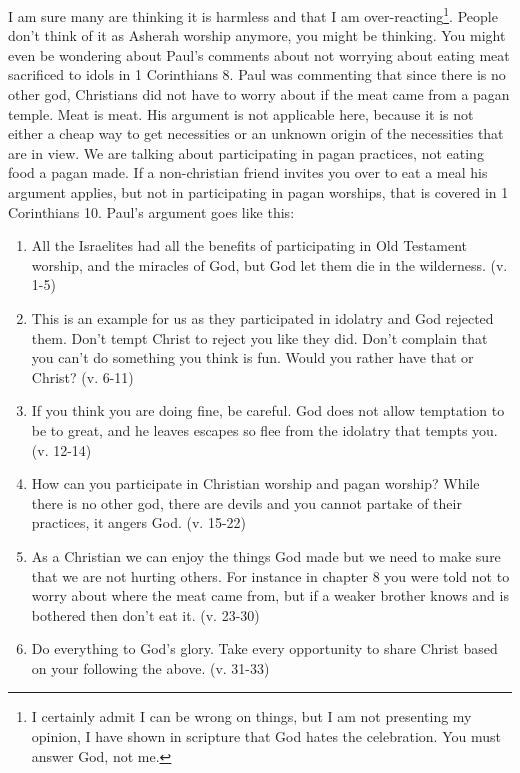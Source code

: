 I am sure many are thinking it is harmless and that I am over-reacting\footnote{I certainly admit I can be wrong on things, but I am not presenting my opinion, I have shown in scripture that God hates the celebration.  You must answer God, not me.}.  People don't think of it as Asherah worship anymore, you might be thinking.  You might even be wondering about Paul's comments about not worrying about eating meat sacrificed to idols in 1 Corinthians 8.  Paul was commenting that since there is no other god, Christians did not have to worry about if the meat came from a pagan temple.  Meat is meat.  His argument is not applicable here, because it is not either a cheap way to get necessities or an unknown origin of the necessities that are in view.  We are talking about participating in pagan practices, not eating food a pagan made.  If a non-christian friend invites you over to eat a meal his argument applies, but not in participating in pagan worships, that is covered in 1 Corinthians 10.  Paul's argument goes like this:
\begin{enumerate}
\item All the Israelites had all the benefits of participating in Old Testament worship, and the miracles of God, but God let them die in the wilderness. (v. 1-5)
\item This is an example for us as they participated in idolatry and God rejected them. Don't tempt Christ to reject you like they did.  Don't complain that you can't do something you think is fun.  Would you rather have that or Christ?  (v. 6-11)
\item If you think you are doing fine, be careful.  God does not allow temptation to be to great, and he leaves escapes so flee from the idolatry that tempts you. (v. 12-14)
\item How can you participate in Christian worship and pagan worship?  While there is no other god, there are devils and you cannot partake of their practices, it angers God.  (v. 15-22)
\item As a Christian we can enjoy the things God made but we need to make sure that we are not hurting others.  For instance in chapter 8 you were told not to worry about where the meat came from, but if a weaker brother knows and is bothered then don't eat it. (v. 23-30)
\item Do everything to God's glory.  Take every opportunity to share Christ based on your following the above.  (v. 31-33)
\end{enumerate}

